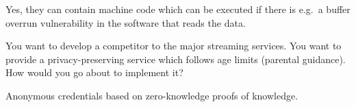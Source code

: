 \begin{frame}
  \begin{solution}
    Yes, they can contain machine code which can be executed if there is e.g.\ 
    a buffer overrun vulnerability in the software that reads the data.
  \end{solution}
\end{frame}



\begin{frame}
  \begin{exercise}
    You want to develop a competitor to the major streaming services.
    You want to provide a privacy-preserving service which follows age limits 
    (parental guidance).
    How would you go about to implement it?
  \end{exercise}
\end{frame}

\begin{frame}
  \begin{solution}
    Anonymous credentials based on zero-knowledge proofs of knowledge.
  \end{solution}
\end{frame}




\begin{frame}[allowframebreaks]
  \printbibliography
\end{frame}
